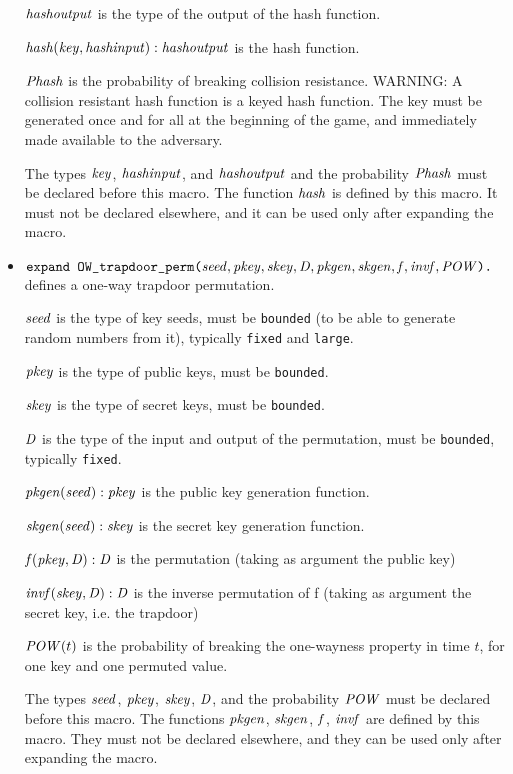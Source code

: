 \documentclass{article}
\begin{document}
\begin{itemize}
   $\mathit{hashoutput}$ is the type of the output of the hash function.

   $\mathit{hash}(\mathit{key}, \mathit{hashinput}): \mathit{hashoutput}$ is the hash function.

   $\mathit{Phash}$ is the probability of breaking collision resistance.
   WARNING: A collision resistant hash function is a keyed hash function.
   The key must be generated once and for all at the beginning of the game,
   and immediately made available to the adversary.

   The types $\mathit{key}$, $\mathit{hashinput}$, and $\mathit{hashoutput}$ and
   the probability $\mathit{Phash}$ must be declared before this macro.
   The function $\mathit{hash}$ is defined by this macro. It must not be
   declared elsewhere, and it can be used only after expanding the
   macro.

\item $\texttt{expand OW\_trapdoor\_perm(}\mathit{seed}, \mathit{pkey}, \mathit{skey}, \mathit{D}, \mathit{pkgen}, \mathit{skgen}, \mathit{f}, \mathit{invf}, \mathit{POW}\texttt{).}$ defines a one-way trapdoor permutation.

   $\mathit{seed}$ is the type of key seeds, must be \texttt{bounded} (to be able to generate random numbers from it), typically \texttt{fixed} and \texttt{large}.

   $\mathit{pkey}$ is the type of public keys, must be \texttt{bounded}.

   $\mathit{skey}$ is the type of secret keys, must be \texttt{bounded}.

   $\mathit{D}$ is the type of the input and output of the permutation, must be \texttt{bounded}, typically \texttt{fixed}.

   $\mathit{pkgen}(\mathit{seed}): \mathit{pkey}$ is the public key generation function.

   $\mathit{skgen}(\mathit{seed}): \mathit{skey}$ is the secret key generation function.

   $\mathit{f}(\mathit{pkey}, \mathit{D}):\mathit{D}$ is the permutation (taking as argument the public key)

   $\mathit{invf}(\mathit{skey}, \mathit{D}):\mathit{D}$ is the inverse permutation of f (taking as argument the secret key,
         i.e. the trapdoor)

   $\mathit{POW}(t)$ is the probability of breaking the one-wayness property
   in time $t$, for one key and one permuted value.

   The types $\mathit{seed}$, $\mathit{pkey}$, $\mathit{skey}$, $\mathit{D}$, and the probability $\mathit{POW}$ must be
   declared before this macro. The functions $\mathit{pkgen}$, $\mathit{skgen}$, $\mathit{f}$, $\mathit{invf}$
   are defined by this macro. They must not be declared elsewhere, and
   they can be used only after expanding the macro. 


\end{itemize}
\end{document}

